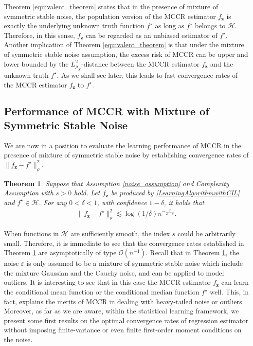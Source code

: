 \documentclass[11pt]{article}
\newtheorem{theorem}{Theorem}
\begin{document}
Theorem \ref{equivalent_theorem} states that in the presence of mixture of symmetric stable noise, the population version of the MCCR estimator $f_\mathbf{z}$ is exactly the underlying unknown truth function $f^\star$ as long as $f^\star$ belongs to $\mathcal{H}$. Therefore, in this sense, $f_\mathbf{z}$ can be regarded as an unbiased estimator of $f^\star$. Another implication of Theorem \ref{equivalent_theorem} is that under the mixture of symmetric stable noise assumption, the excess risk of MCCR can be upper and lower bounded by the $L^2_{\rho_X}$-distance between the MCCR estimator $f_\mathbf{z}$ and the unknown truth $f^\star$. As we shall see later, this leads to fast convergence rates of the MCCR estimator $f_\mathbf{z}$ to $f^\star$.   


\subsection{Performance of MCCR with Mixture of Symmetric Stable Noise}
We are now in a position to evaluate the learning performance of MCCR in the presence of mixture of symmetric stable noise by establishing convergence rates of $\|f_\mathbf{z}-f^\star\|_\rho^2$.


\begin{theorem}\label{performance_MCCR}
	Suppose that Assumption \ref{noise_assumption} and Complexity Assumption with $s>0$ hold. Let $f_\mathbf{z}$ be produced by \eqref{LearningAlgorithmwithCIL} and $f^\star\in\mathcal{H}$. For any $0<\delta<1$, with confidence $1-\delta$, it holds that
	\begin{align*}
	\|f_\mathbf{z}-f^\star\|_\rho^2\lesssim \log(1/\delta)n^{-\frac{2}{2+s}}.
	\end{align*} 
\end{theorem}

When functions in $\mathcal{H}$ are sufficiently smooth, the index $s$ could be arbitrarily small. Therefore, it is immediate to see that the convergence rates established in Theorem \ref{performance_MCCR} are asymptotically of type $\mathcal{O}(n^{-1})$. Recall that in Theorem \ref{performance_MCCR}, the noise $\varepsilon$ is only assumed to be a mixture of symmetric stable noise which include the mixture Gaussian and the Cauchy noise, and can be applied to model outliers. It is interesting to see that in this case the MCCR estimator $f_\mathbf{z}$ can learn the conditional mean function or the conditional median function $f^\star$ well. This, in fact, explains the merits of MCCR in dealing with heavy-tailed noise or outliers. Moreover, as far as we are aware, within the statistical learning framework, we present some first results on the optimal convergence rates of regression estimator without imposing finite-variance or even finite first-order moment conditions on the noise. 
\end{document}

